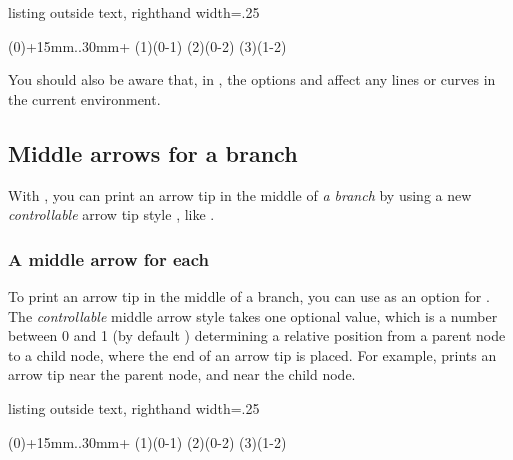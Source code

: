 \begin{tcblisting}{listing outside text, righthand width=.25\linewidth}
\setistgameshorten{1.3pt} %
\begin{istgame}[->,scale=.8]
\istroot(0)+15mm..30mm+  \istb \istb \endist
\istroot(1)(0-1)         \istb \istb \endist
\istroot(2)(0-2)         \istb \istb \endist
\istroot(3)(1-2)         \istb \istb \endist
\end{istgame}
\end{tcblisting}

You should also be aware that, in \Tikz, the options  and \xw{->} affect any lines or curves in the current environment.


\subsection{Middle arrows for a branch}
\label{sec:showmidarrows}

With \cmd{\istb}, you can print an arrow tip in the middle of \emph{a branch} by using a new \emph{controllable} arrow tip style \ixttw{->-}, 
like \xw{\istb[->-]}.

\subsubsection{A middle arrow for each \protect\cmd{\istb}}

To print an arrow tip in the middle of a branch, you can use \xw{->-} as an option for \cmd{\istb}.
The \emph{controllable} middle arrow style \xw{->-} takes one optional value, which is a number between 0 and 1 (by default ) determining a relative position from a parent node to a child node, where the end of an arrow tip is placed.
For example, \xw{\istb[->-=0.1]} prints an arrow tip near the parent node, and \xw{\istb[->-=0.9]} near the child node.

\begin{tcblisting}{listing outside text, righthand width=.25\linewidth}
\begin{istgame}[scale=.8]
\istroot(0)+15mm..30mm+
  \istb[->-] \istb[->-] \endist
\istroot(1)(0-1)
  \istb[->-=.3] \istb[->-=.9] \endist
\istroot(2)(0-2)
  \istb[->-=.7,draw=blue] \istb[->-=.2,draw=red] \endist
\istroot(3)(1-2)
  \istb \istb[->-=1] \endist
\end{istgame}
\end{tcblisting}

